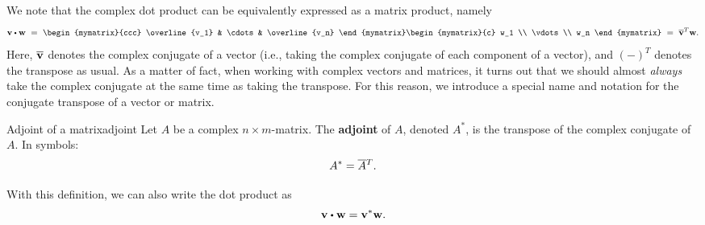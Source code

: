 We note that the complex dot product can be equivalently expressed as
a matrix product, namely
\begin{equation*}
  \vect{v}\dotprod\vect{w}
  ~=~ \begin{mymatrix}{ccc} \overline{v_1} & \cdots & \overline{v_n} \end{mymatrix}
  \begin{mymatrix}{c} w_1 \\ \vdots \\ w_n \end{mymatrix}
  ~=~ \overline{\vect{v}}^T \vect{w}.
\end{equation*}
Here, $\overline{\vect{v}}$ denotes the complex conjugate of a vector
(i.e., taking the complex conjugate of each component of a vector),
and $(-)^T$ denotes the transpose as usual.  As a matter of fact, when
working with complex vectors and matrices, it turns out that we should
almost {\em always} take the complex conjugate at the same time as
taking the transpose. For this reason, we introduce a special name and
notation for the conjugate transpose of a vector or matrix.

\begin{definition}{Adjoint of a matrix}{adjoint}
  Let $A$ be a complex $n\times m$-matrix. The \textbf{adjoint} of
  $A$, denoted $A^*$, is the transpose of the complex conjugate of
  $A$. In symbols:
  \begin{equation*}
    A^{*} = \overline{A}{}^T.
  \end{equation*}
\end{definition}

With this definition, we can also write the dot product as
\begin{equation*}
  \vect{v}\dotprod\vect{w} = \vect{v}^{\adjoint}\vect{w}.
\end{equation*}

